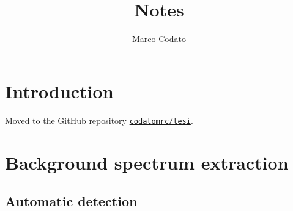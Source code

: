 \documentclass{article}
\author{Marco Codato}
\title{Notes}
\begin{document}
\maketitle

\section{Introduction}

Moved to the GitHub repository  \href{https://github.com/codatomrc/tesi}{\texttt{codatomrc/tesi}}.

\section{Background spectrum extraction}

\subsection{Automatic detection}
\end{document}
